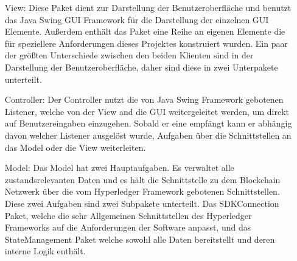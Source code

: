 \documentclass[parskip=full]{scrartcl}
\begin{document}
	\begin{itemize}
		\item[View:] Diese Paket dient zur Darstellung der Benutzeroberfläche und benutzt das Java Swing GUI Framework für die Darstellung der einzelnen GUI Elemente. Außerdem enthält das Paket eine Reihe an eigenen Elemente die für speziellere Anforderungen dieses Projektes konstruiert wurden. Ein paar der größten Unterschiede zwischen den beiden Klienten sind in der Darstellung der Benutzeroberfläche, daher sind diese in zwei Unterpakete unterteilt.
		\item[Controller:] Der Controller nutzt die von Java Swing Framework gebotenen Listener, welche von der View and die GUI weitergeleitet werden, um direkt auf Benutzereingaben einzugehen. Sobald er eine empfängt kann er abhängig davon welcher Listener ausgelöst wurde, Aufgaben über die Schnittstellen an das Model oder die View weiterleiten.
		\item[Model:] Das Model hat zwei Hauptaufgaben. Es verwaltet alle zustandsrelevanten Daten und es hält die Schnittstelle zu dem Blockchain Netzwerk über die vom Hyperledger Framework gebotenen Schnittstellen. Diese zwei Aufgaben sind zwei Subpakete unterteilt. Das SDKConnection Paket, welche die sehr Allgemeinen Schnittstellen des Hyperledger Frameworks auf die Anforderungen der Software anpasst, und das StateManagement Paket welche sowohl alle Daten bereitstellt und deren interne Logik enthält.   
	\end{itemize} 
		
	\newpage
	
\end{document}

